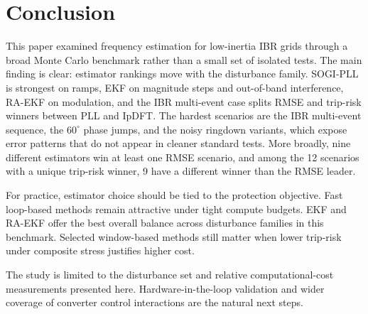 \section{Conclusion}
\label{sec:conclusion}

This paper examined frequency estimation for low-inertia IBR grids through a
broad Monte Carlo benchmark rather than a small set of isolated tests. The
main finding is clear: estimator rankings move with the disturbance family.
SOGI-PLL is strongest on ramps, EKF on magnitude steps and out-of-band
interference, RA-EKF on modulation, and the IBR multi-event case splits RMSE
and trip-risk winners between PLL and IpDFT. The hardest scenarios are the IBR
multi-event sequence, the $60^\circ$ phase jumps, and the noisy ringdown
variants, which expose error patterns that do not appear in cleaner standard
tests. More broadly, nine different estimators win at least one RMSE scenario,
and among the 12 scenarios with a unique trip-risk winner, 9 have a different
winner than the RMSE leader.

For practice, estimator choice should be tied to the protection objective.
Fast loop-based methods remain attractive under tight compute budgets. EKF and
RA-EKF offer the best overall balance across disturbance families in this
benchmark. Selected window-based methods still matter when lower trip-risk
under composite stress justifies higher cost.

The study is limited to the disturbance set and relative computational-cost
measurements presented here. Hardware-in-the-loop validation and wider
coverage of converter control interactions are the natural next steps.
